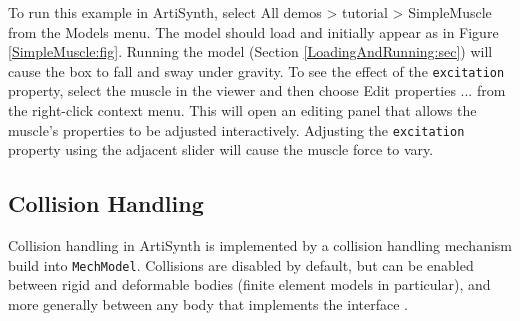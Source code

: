 To run this example in ArtiSynth, select {\sf All demos > tutorial >
SimpleMuscle} from the {\sf Models} menu. The model should load and
initially appear as in Figure \ref{SimpleMuscle:fig}.  Running the
model (Section \ref{LoadingAndRunning:sec}) will cause the box to fall
and sway under gravity. To see the effect of the {\tt excitation}
property, select the muscle in the viewer and then choose {\sf Edit
properties ...} from the right-click context menu.  This will open an
editing panel that allows the muscle's properties to be adjusted
interactively. Adjusting the {\tt excitation} property using the
adjacent slider will cause the muscle force to vary.







\subsection{Collision Handling}

Collision handling in ArtiSynth is implemented by a collision
handling mechanism build into {\tt MechModel}. Collisions are
disabled by default, but can be enabled between rigid and deformable
bodies (finite element models in particular), and more generally
between any body that implements the interface 
.

